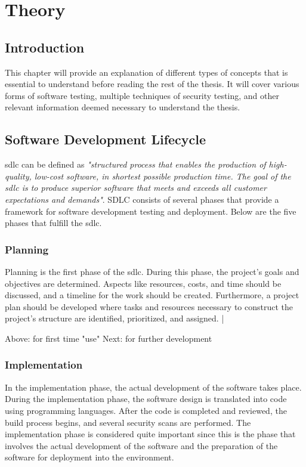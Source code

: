 \chapter{Theory}
\label{chap:Theory}

\section{Introduction}
This chapter will provide an explanation of different types of concepts that is essential to understand before reading the rest of the thesis. It will cover various forms of software testing, multiple techniques of security testing, and other relevant information deemed necessary to understand the thesis.


\section{Software Development Lifecycle}
\acrlong{sdlc} can be defined as \textit{"structured process that enables the production of high-quality, low-cost software, in shortest possible production time. The goal of the \acrshort{sdlc} is to produce superior software that meets and exceeds all customer expectations and demands"}\cite{sdlc1}.  SDLC consists of several phases that provide a framework for software development testing and deployment. Below are the five phases that fulfill the \acrshort{sdlc}. 

\subsection{Planning} 
Planning is the first phase of the \acrshort{sdlc}. During this phase, the project's goals and objectives are determined. Aspects like resources, costs, and time should be discussed, and a timeline for the work should be created.  Furthermore, a project plan should be developed where tasks and resources necessary to construct the project's structure are identified, prioritized, and assigned. \cite{planningphase}|

Above: for first time "use"
Next: for further development
\subsection{Implementation}
In the implementation phase, the actual development of the software takes place. During the implementation phase, the software design is translated into code using programming languages. After the code is completed and reviewed, the build process begins, and several security scans are performed.
The implementation phase is considered quite important since this is the phase that involves the actual development of the software and the preparation of the software for deployment into the environment.  \cite{ImplementationSDLC}
 
